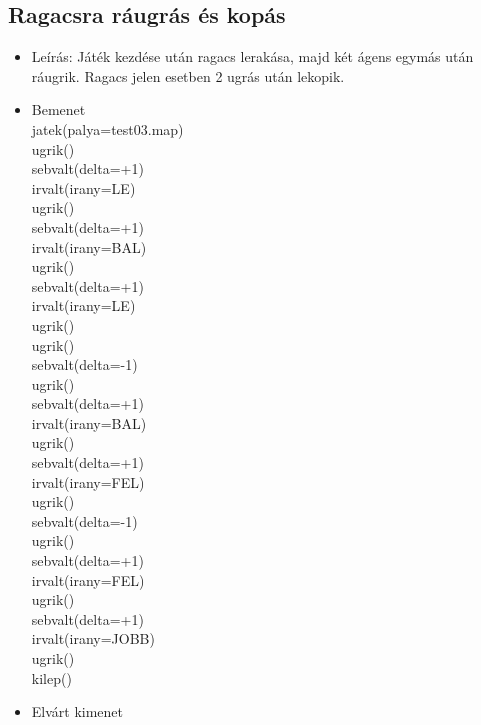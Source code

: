 \subsection{Ragacsra ráugrás és kopás}
\begin{itemize}
	\item Leírás: Játék kezdése után ragacs lerakása, majd két ágens egymás után ráugrik. Ragacs jelen esetben 2 ugrás után lekopik.
	\item Bemenet\\
    jatek(palya=test03.map)\\
    ugrik()\\
    sebvalt(delta=+1)\\
    irvalt(irany=LE)\\
    ugrik()\\
    sebvalt(delta=+1)\\
    irvalt(irany=BAL)\\
    ugrik()\\
    sebvalt(delta=+1)\\
    irvalt(irany=LE)\\
    ugrik()\\
    ugrik()\\
    sebvalt(delta=-1)\\
    ugrik()\\
    sebvalt(delta=+1)\\
    irvalt(irany=BAL)\\
    ugrik()\\
    sebvalt(delta=+1)\\
    irvalt(irany=FEL)\\
    ugrik()\\
    sebvalt(delta=-1)\\
    ugrik()\\
    sebvalt(delta=+1)\\
    irvalt(irany=FEL)\\
    ugrik()\\
    sebvalt(delta=+1)\\
    irvalt(irany=JOBB)\\
    ugrik()\\
    kilep()\\
	\item Elvárt kimenet\\

\end{itemize}

